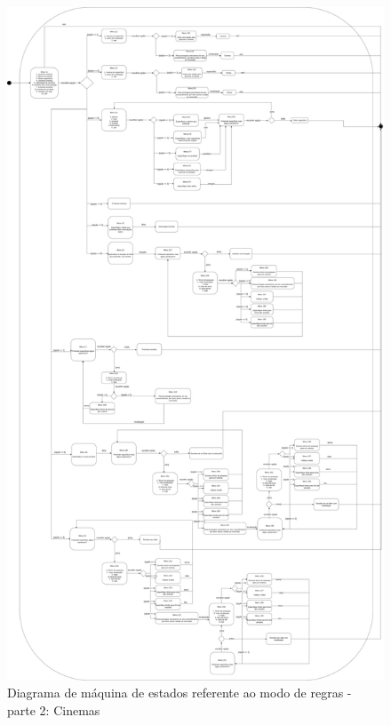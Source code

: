 \documentclass[11pt,a4paper]{article}
\begin{document}
\begin{appendices}
\begin{figure}[H]
    \centering
    \includegraphics[width=12cm]{images/PEI_StateMachine-Cinemas.png}
    \caption{Diagrama de máquina de estados referente ao modo de regras - parte 2: Cinemas}
    \label{machine2}
\end{figure}


\end{appendices}
\end{document}
